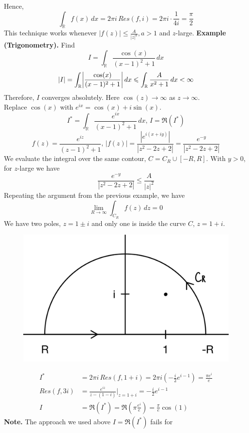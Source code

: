 \documentclass[11pt]{article}
\DeclarePairedDelimiter\abs{\lvert}{\rvert}
\begin{document}
Hence, 
$$ \int_{\mathbb{R}}f(x) \, dx = 2\pi i \, Res(f, i) = 2\pi i \cdot \frac{1}{4i} = \frac{\pi}{2}$$
This technique works whenever $|f(z)| \leqslant \frac{A}{|z|^a}, a > 1$ and $z$-large.
\newpage
\textbf{Example (Trigonometry).} Find 
$$ I = \int_{\mathbb{R}}\frac{\cos(x)}{(x - 1)^2 + 1} \, dx$$
$$ |I| = \int_{\mathbb{R}}\abs*{\frac{\cos(x)}{(x - 1)^2 + 1}} \, dx \leqslant \int_{\mathbb{R}}\frac{A}{x^2 + 1} \, dx < \infty$$
Therefore, $I$ converges absolutely. Here $\cos(z) \to \infty$ as $z \to \infty$. \\
Replace $\cos(x)$ with $e^{ix} = \cos(x) + i\sin(x)$. 
$$ I^\ast = \int_{\mathbb{R}}\frac{e^{ix}}{(x - 1)^2 + 1} \, dx, \, I = \Re(I^\ast)$$
$$ f(z) = \frac{e^{iz}}{(z - 1)^2 + 1}, \, |f(z)| = \frac{|e^{i(x + iy)}|}{|z^2 - 2z + 2|} = \frac{e^{-y}}{|z^2 - 2z + 2|}$$
We evaluate the integral over the same contour, $C = C_R \cup [-R, R]$. With $y > 0$, for $z$-large we have 
$$\frac{e^{-y}}{|z^2 - 2z + 2|} \leqslant \frac{A}{|z|^2} $$
Repeating the argument from the previous example, we have 
$$ \lim_{R \to \infty} \int_{C_R}f(z) \,dz = 0$$
We have two poles, $z = 1 \pm i$ and only one is inside the curve $C$, $z = 1 + i$.
\begin{figure}[h]
\includegraphics[scale=0.2]{21_3} 
\centering
\end{figure} 
\begin{align*}
I^\ast &= 2\pi i\,Res(f, 1 + i) = 2\pi i \left(-\frac{i}{2}e^{i - 1}\right) = \frac{\pi e^i}{e} \\
Res(f, 3i) &= \frac{e^{iz}}{z - (1 - i)}\bigg\rvert_{z = 1 + i} = -\frac{i}{2}e^{i - 1} \\
I &= \Re(I^\ast) = \Re\left(\pi \frac{e^i}{e}\right) = \frac{\pi}{e}\cos(1)
\end{align*}
\newpage
\textbf{Note.} The approach we used above $I = \Re(I ^\ast)$ fails for 
\end{document}
